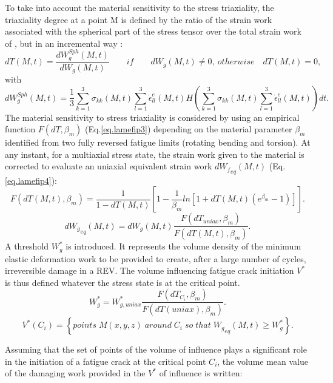 To take into account the material sensitivity to the stress triaxiality, the triaxiality degree at a point M is defined by the ratio of the strain work associated with the spherical part of the stress tensor over the total strain work of \cite{banvillet2003volumetric}, but in an incremental way :
$$dT(M,t)=\dfrac{dW_g^{Sph}(M,t)}{dW_g(M,t)} \qquad if \qquad  dW_g(M,t)\neq0,\ otherwise \quad dT(M,t)=0,$$
with
$$dW_g^{Sph}(M,t)=\dfrac{1}{3}\sum_{k=1}^{3}\sigma_{kk}(M,t)\sum_{l=1}^{3}\dot{\epsilon}_{ll}^e(M,t)H\left( \sum_{k=1}^{3}\sigma_{kk}(M,t)\sum_{l=1}^{3}\dot{\epsilon}_{ll}^e(M,t)\right)dt .$$
The material sensitivity to stress triaxiality is considered by using an empirical function
$F(dT,\beta_m)$ (Eq.\eqref{eq.lamefip3}) depending on the material parameter $\beta_m$ identified from two fully reversed
fatigue limits (rotating bending and torsion). At any instant, for a multiaxial stress state, the
strain work given to the material is corrected to evaluate an uniaxial equivalent strain work
$d{W_f}_{eq} (M,t)$ (Eq.\eqref{eq.lamefip4}):
\begin{equation}
F(dT(M,t),\beta_m)=\dfrac{1}{1-dT(M,t)}\left[ 1-\dfrac{1}{\beta_m}ln\left[1+dT(M,t)(e^{\beta_m}-1) \right] \right] .
\label{eq.lamefip3}
\end{equation}
\begin{equation}
d{W_g}_{eq} (M,t)=d{W_g}(M,t)\dfrac{F(dT_{uniax},\beta_m)}{F(dT(M,t),\beta_m)}.
\label{eq.lamefip4}
\end{equation}
A threshold $W_g^*$ is introduced. It represents the volume density of the minimum elastic deformation work to be provided to create, after a large number of cycles, irreversible damage in a REV. The volume influencing fatigue crack initiation $V^*$ is thus
defined whatever the stress state is at the critical point.
\begin{equation}
W_g^*=W^*_{g,uniax}\dfrac{F(dT_{C_i},\beta_m)}{F(dT(uniax),\beta_m)}.
\label{eq.lamefip5}
\end{equation}
\begin{equation}
V^*(C_i)=\left\lbrace points \; M(x,y,z) \; around \; C_i \; so \; that \; {W_g}_{eq} (M,t)\geqslant W_g^*\right\rbrace .
\label{eq.lamefip6}
\end{equation}

 Assuming that the set of points of the volume of influence plays a significant role in the initiation of a fatigue crack at the critical point $C_i$, the volume mean value of the damaging work provided in the $V^*$ of influence is written:

